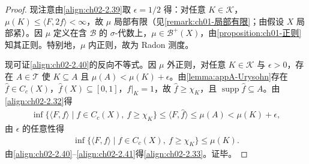 \documentclass[../../main.tex]{subfiles}%
\begin{document}
\begin{proof}
现注意由\eqref{align:ch02-2.39}取 $\epsilon=1/2$ 得：对任意 $K\in\mathscr K$，$\mu(K)\leqslant\langle F,2f\rangle<\infty$，故 $\mu$ 局部有限（见\cref{remark:ch01-局部有限}；由假设 $X$ 局部紧）。因 $\mu$ 定义在含 $\mathscr B$ 的 $\sigma$-代数上，$\mu\in\mathscr B^+(X)$，由\cref{proposition:ch01-正则}知其正则。特别地，$\mu$ 内正则，故为 Radon 测度。

现可证\eqref{align:ch02-2.40}的反向不等式。因 $\mu$ 外正则，对任意 $K\in\mathscr K$ 与 $\epsilon>0$，存在 $A\in\mathscr T$ 使 $K\subseteq A$ 且 $\mu(A)<\mu(K)+\epsilon$。由\cref{lemma:appA-Urysohn}存在 $\hat f\in C_c(X)$，$\hat f(X)\subseteq[0,1]$，$\hat f|_K=1$，故 $\hat f\geqslant\chi_K$，且 $\operatorname{supp}\hat f\subseteq A$。由\eqref{align:ch02-2.32}得
\begin{align*}
\inf\{\langle F,f\rangle\mid f\in C_c(X),\ f\geqslant\chi_K\}\leqslant\langle F,\hat f\rangle\leqslant\mu(A)<\mu(K)+\epsilon,
\end{align*}
由 $\epsilon$ 的任意性得
\begin{align}
\inf\{\langle F,f\rangle\mid f\in C_c(X),\ f\geqslant\chi_K\}\leqslant\mu(K). \label{align:ch02-2.41}
\end{align}
由\eqref{align:ch02-2.40}--\eqref{align:ch02-2.41}得\eqref{align:ch02-2.33}。证毕。
\end{proof}
\end{document}
